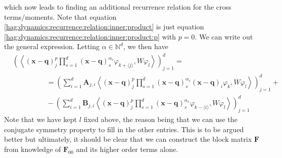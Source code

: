 which now leads to finding an additional recurrence relation 
for the cross terms/moments. 
Note that equation \eqref{hag:dynamics:recurrence:relation:inner:product}
is just equation \eqref{hag:dynamics:recurrence:relation:inner:product:p} 
with $p=0$. We can write out the general expression. Letting 
$\alpha \in \mathbb{N}^d$, we then have 
\begin{equation}
  \begin{split}
    &\left(
    \left \langle
      (\bm{x} - \bm{q})^{p}_{j}
      \prod_{s=1}^{d} (\bm{x} - \bm{q})^{\alpha_s}_{s} 
      \varphi_{k + \langle j \rangle}, W \varphi_{l}
  \right \rangle
\right)_{j=1}^d
=
\\
    &
    \hspace{2cm}
    =
    \left(
      \sum_{i=1}^d
     \bm{A}_{j,i} 
     \left \langle 
     (\bm{x} - \bm{q})^p_j
     \prod_{s=1}^{d} (\bm{x} - \bm{q})^{\alpha_s}_{s} 
     (\bm{x} - \bm{q})_{i}\varphi_k,
     W \varphi_l \right \rangle
    \right)_{j=1}^d +
    \\
    &
    \hspace{2cm}
    - \left(
      \sum_{i=1}^d
      \bm{B}_{j,i}
      \left \langle 
      (\bm{x}-\bm{q})_j^p
      \prod_{s=1}^{d} (\bm{x} - \bm{q})^{\alpha_s}_{s} 
      \varphi_{k - \langle i  \rangle}, 
      W \varphi_l \right \rangle
      \right)_{j=1}^d
\end{split}
\end{equation}
%
Note that we have kept $l$ fixed above, the reason being that 
we can use the conjugate symmetry property to fill in the 
other entries.
This is to be argued better but ultimately, it should be 
clear that we can construct the block matrix $\bm{F}$ from 
knowledge of $\bm{F}_{00}$ and its higher order terms alone.

